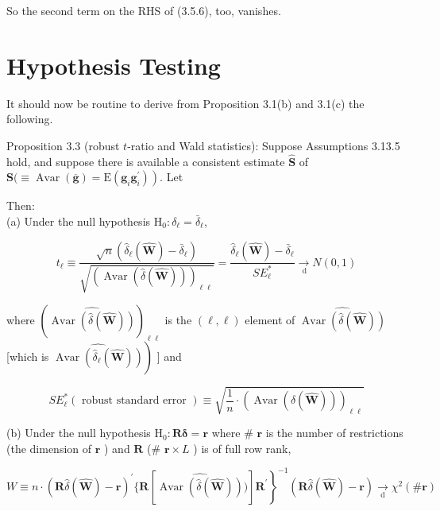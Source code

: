 \documentclass[10pt]{article}
\begin{document}
So the second term on the RHS of (3.5.6), too, vanishes.

\section*{Hypothesis Testing}
It should now be routine to derive from Proposition 3.1(b) and 3.1(c) the following.

Proposition 3.3 (robust $t$-ratio and Wald statistics): Suppose Assumptions 3.13.5 hold, and suppose there is available a consistent estimate $\widehat{\mathbf{S}}$ of $\mathbf{S}(\equiv \operatorname{Avar}(\overline{\mathbf{g}})= \left.\mathrm{E}\left(\mathbf{g}_{i} \mathbf{g}_{i}^{\prime}\right)\right)$. Let

Then:\\
(a) Under the null hypothesis $\mathrm{H}_{0}: \delta_{\ell}=\bar{\delta}_{\ell}$,

$$
t_{\ell} \equiv \frac{\sqrt{n}\left(\hat{\delta}_{\ell}(\widehat{\mathbf{W}})-\bar{\delta}_{\ell}\right)}{\sqrt{(\operatorname{Avar}(\hat{\delta}(\widehat{\mathbf{W}})))_{\ell \ell}}}=\frac{\hat{\delta}_{\ell}(\widehat{\mathbf{W}})-\bar{\delta}_{\ell}}{S E_{\ell}^{*}} \underset{\mathrm{~d}}{\rightarrow} N(0,1)
$$

where $(\widehat{\operatorname{Avar}(\hat{\delta}(\widehat{\mathbf{W}}))})_{\ell \ell}$ is the $(\ell, \ell)$ element of $\widehat{\operatorname{Avar}(\hat{\delta}(\widehat{\mathbf{W}}))}$ [which is $\left.\widehat{\operatorname{Avar}\left(\hat{\delta}_{\ell}(\widehat{\mathbf{W}})\right)}\right)$ ] and


\begin{equation*}
S E_{\ell}^{*}(\text { robust standard error }) \equiv \sqrt{\frac{1}{n} \cdot(\operatorname{Avar}(\hat{\delta}(\widehat{\mathbf{W}})))_{\ell \ell}} \tag{3.5.7}
\end{equation*}


(b) Under the null hypothesis $\mathrm{H}_{0}: \mathbf{R} \boldsymbol{\delta}=\mathbf{r}$ where \# $\mathbf{r}$ is the number of restrictions (the dimension of $\mathbf{r}$ ) and $\mathbf{R}$ (\# $\mathbf{r} \times L$ ) is of full row rank,


\begin{equation*}
\left.W \equiv n \cdot(\mathbf{R} \hat{\delta}(\widehat{\mathbf{W}})-\mathbf{r})^{\prime}\{\mathbf{R}[\widehat{\operatorname{Avar}(\hat{\delta}(\widehat{\mathbf{W}}))})] \mathbf{R}^{\prime}\right\}^{-1}(\mathbf{R} \hat{\delta}(\widehat{\mathbf{W}})-\mathbf{r}) \underset{\mathrm{d}}{\rightarrow} \chi^{2}(\# \mathbf{r}) \tag{3.5.8}
\end{equation*}
\end{document}
